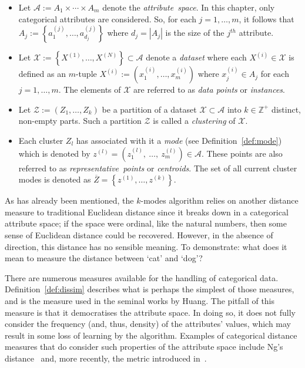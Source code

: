 \begin{itemize}
    \item Let \(\mathcal{A} := A_1 \times \cdots \times A_m\) denote the
        \emph{attribute~space}. In this chapter, only categorical attributes are
        considered. So, for each \(j = 1, \ldots, m\), it follows that
        \(A_j := \left\{a_1^{(j)}, \ldots, a_{d_j}^{(j)}\right\}\) where
        \(d_j=|A_j|\) is the size of the \(j^{th}\) attribute.

    \item Let \(\mathcal{X} := \left\{X^{(1)}, \ldots, X^{(N)}\right\} \subset
        \mathcal{A}\) denote a \emph{dataset} where each \(X^{(i)} \in
        \mathcal{X}\) is defined as an \(m\)-tuple \(X^{(i)} := \left(x_1^{(i)},
        \ldots, x_m^{(i)}\right)\) where \(x_j^{(i)} \in A_j\) for each \(j = 1,
        \ldots, m\). The elements of \(\mathcal{X}\) are referred to as
        \emph{data points} or \emph{instances}.
    \item Let \(\mathcal{Z} := \left(Z_1, \ldots, Z_k\right)\) be a partition
        of a dataset \(\mathcal{X} \subset \mathcal A\) into \(k \in
        \mathbb{Z}^{+}\) distinct, non-empty parts. Such a partition
        \(\mathcal{Z}\) is called a \emph{clustering} of \(\mathcal{X}\).

    \item Each cluster \(Z_l\) has associated with it a
        \emph{mode} (see Definition~\ref{def:mode}) which is
        denoted by \(z^{(l)} = \left(z_1^{(l)},~\ldots,~z_m^{(l)}\right) \in
        \mathcal{A}\).  These points are also referred to as
        \emph{representative~points} or \emph{centroids}. The set of all current
        cluster modes is denoted as \(\overline Z = \left\{z^{(1)}, \ldots,
        z^{(k)}\right\}\).
\end{itemize}

As has already been mentioned, the \(k\)-modes algorithm relies on another
distance measure to traditional Euclidean distance since it breaks down in a
categorical attribute space; if the space were ordinal, like the natural
numbers, then some sense of Euclidean distance could be recovered. However, in
the absence of direction, this distance has no sensible meaning. To demonstrate:
what does it mean to measure the distance between `cat' and `dog'?

There are numerous measures available for the handling of categorical data.
Definition~\ref{def:dissim} describes what is perhaps the simplest of those
measures, and is the measure used in the seminal works by Huang. The pitfall of
this measure is that it democratises the attribute space. In doing so, it does
not fully consider the frequency (and, thus, density) of the attributes' values,
which may result in some loss of learning by the algorithm. Examples of
categorical distance measures that do consider such properties of the attribute
space include Ng's distance~\cite{Ng2007} and, more recently, the metric
introduced in~\cite{Cao2012}.

